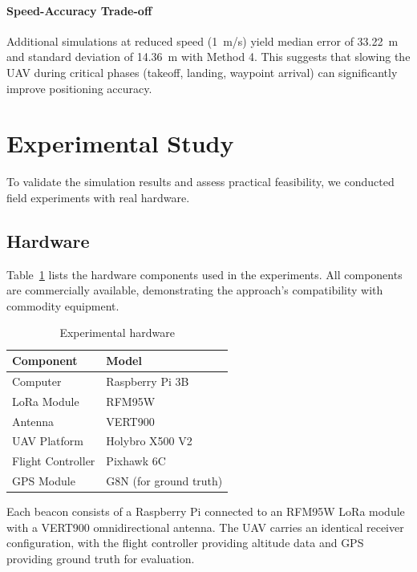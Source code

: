 \documentclass[master,final,11pt]{iscs-thesis}
\begin{document}
\paragraph{Speed-Accuracy Trade-off}
Additional simulations at reduced speed (1~m/s) yield median error of 33.22~m and standard deviation of 14.36~m with Method 4.
This suggests that slowing the UAV during critical phases (takeoff, landing, waypoint arrival) can significantly improve positioning accuracy.

\section{Experimental Study}
\label{sec:uav_experiment}

To validate the simulation results and assess practical feasibility, we conducted field experiments with real hardware.

\subsection{Hardware}

Table~\ref{tab:hardware} lists the hardware components used in the experiments.
All components are commercially available, demonstrating the approach's compatibility with commodity equipment.

\begin{table}[htbp]
\centering
\caption{Experimental hardware}
\label{tab:hardware}
\begin{tabular}{@{}ll@{}}
\toprule
\textbf{Component} & \textbf{Model} \\
\midrule
Computer & Raspberry Pi 3B \\
LoRa Module & RFM95W \\
Antenna & VERT900 \\
UAV Platform & Holybro X500 V2 \\
Flight Controller & Pixhawk 6C \\
GPS Module & G8N (for ground truth) \\
\bottomrule
\end{tabular}
\end{table}

Each beacon consists of a Raspberry Pi connected to an RFM95W LoRa module with a VERT900 omnidirectional antenna.
The UAV carries an identical receiver configuration, with the flight controller providing altitude data and GPS providing ground truth for evaluation.
\end{document}
